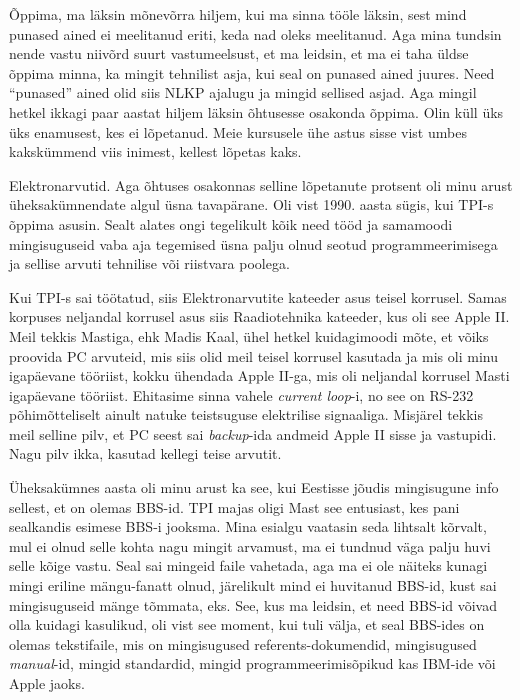 
Õppima, ma läksin mõnevõrra hiljem, kui ma sinna tööle läksin, sest mind 
punased ained ei  meelitanud eriti, keda nad oleks meelitanud. Aga mina tundsin 
nende vastu niivõrd suurt vastumeelsust,  et ma leidsin, et ma ei taha  üldse 
õppima minna, ka mingit tehnilist asja, kui seal on  punased ained juures. Need 
\enquote{punased} ained olid siis  NLKP ajalugu ja mingid sellised asjad. Aga 
mingil hetkel ikkagi paar aastat hiljem läksin õhtusesse osakonda õppima. Olin 
küll üks  üks enamusest, kes ei lõpetanud. Meie kursusele ühe astus sisse vist 
umbes kakskümmend viis inimest, kellest lõpetas kaks. 


Elektronarvutid. Aga õhtuses osakonnas selline lõpetanute protsent oli minu 
arust üheksakümnendate algul üsna tavapärane. Oli vist 1990. aasta sügis, kui 
TPI-s õppima asusin. Sealt alates ongi tegelikult kõik need tööd ja samamoodi 
mingisuguseid vaba aja tegemised üsna palju olnud seotud programmeerimisega ja 
sellise arvuti tehnilise või riistvara poolega.

Kui  TPI-s sai töötatud, siis Elektronarvutite kateeder asus teisel korrusel. 
Samas korpuses neljandal korrusel asus siis Raadiotehnika 
kateeder, kus oli see Apple II. Meil tekkis 
Mastiga, ehk Madis Kaal, 
ühel hetkel kuidagimoodi mõte, et võiks proovida PC arvuteid, mis siis olid 
meil teisel korrusel kasutada ja mis oli minu igapäevane tööriist, kokku 
ühendada  Apple II-ga, mis oli neljandal korrusel Masti igapäevane tööriist. 
Ehitasime sinna vahele \emph{current loop}-i, no see on RS-232 põhimõtteliselt 
ainult natuke teistsuguse elektrilise signaaliga. Misjärel tekkis meil  selline 
pilv, et PC seest sai \emph{backup}-ida  andmeid Apple II sisse ja vastupidi. 
Nagu pilv ikka, kasutad kellegi teise arvutit. 

Üheksakümnes aasta oli minu arust ka see, kui Eestisse jõudis mingisugune info 
sellest, et on olemas BBS-id. TPI majas oligi Mast  see 
entusiast, kes pani sealkandis esimese BBS-i jooksma. Mina esialgu vaatasin 
seda lihtsalt kõrvalt, mul ei olnud selle kohta nagu mingit arvamust,  ma ei 
tundnud  väga palju huvi selle kõige vastu. Seal sai mingeid faile vahetada, 
aga  ma ei ole näiteks kunagi mingi eriline mängu-fanatt olnud, järelikult mind 
ei huvitanud BBS-id, kust sai mingisuguseid mänge tõmmata, eks. See, kus ma 
leidsin, et need BBS-id võivad olla kuidagi kasulikud,  oli vist see moment, 
kui tuli välja, et seal BBS-ides on olemas  tekstifaile, mis on mingisugused 
referents-dokumendid, mingisugused \emph{manual}-id, mingid standardid, mingid 
programmeerimisõpikud kas IBM-ide või Apple jaoks.

